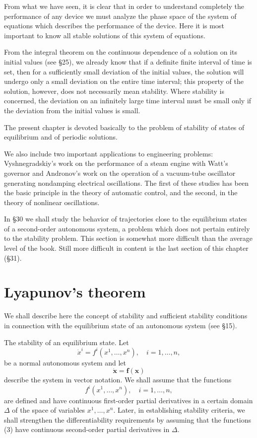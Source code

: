 \documentclass[10pt,a5paper]{book}
\theoremstyle{plain}
\theoremstyle{definition}
\theoremstyle{remark}
\begin{document}
From what we have seen, it is clear that in order to understand completely the performance of any device we must analyze the phase space of the system of equations which describes the performance of the device. Here it is most important to know all stable solutions of this system of equations.

From the integral theorem on the continuous dependence of a solution on its initial values (see §25), we already know that if a definite finite interval of time is set, then for a sufficiently small deviation of the initial values, the solution will undergo only a small deviation on the entire time interval; this property of the solution, however, does not necessarily mean stability. Where stability is concerned, the deviation on an infinitely large time interval must be small only if the deviation from the initial values is small.

The present chapter is devoted basically to the problem of stability of states of equilibrium and of periodic solutions.

We also include two important applications to engineering problems: Vyshnegradskiy's work on the performance of a steam engine with Watt's governor and Andronov's work on the operation of a vacuum-tube oscillator generating nondamping electrical oscillations. The first of these studies has been the basic principle in the theory of automatic control, and the second, in the theory of nonlinear oscillations.

In §30 we shall study the behavior of trajectories close to the equilibrium states of a second-order autonomous system, a problem which does not pertain entirely to the stability problem. This section is somewhat more difficult than the average level of the book. Still more difficult in content is the last section of this chapter (§31).

\section{Lyapunov's theorem}
We shall describe here the concept of stability and sufficient stability conditions in connection with the equilibrium state of an autonomous system (see §15).

The stability of an equilibrium state. Let
\begin{equation*}
\dot{x}^{i}=f^{i}\left(x^{1}, \ldots, x^{n}\right), \quad i=1, \ldots, n, \tag{1}
\end{equation*}
be a normal autonomous system and let
\begin{equation*}
\dot{\mathbf{x}}=\mathbf{f}(\mathbf{x}) \tag{2}
\end{equation*}
describe the system in vector notation. We shall assume that the functions
\begin{equation*}
f^{i}\left(x^{1}, \ldots, x^{n}\right), \quad i=1, \ldots, n, \tag{3}
\end{equation*}
are defined and have continuous first-order partial derivatives in a certain domain $\Delta$ of the space of variables $x^{1}, \ldots, x^{n}$. Later, in establishing stability criteria, we shall strengthen the differentiability requirements by assuming that the functions (3) have continuous second-order partial derivatives in $\Delta$.
\end{document}
